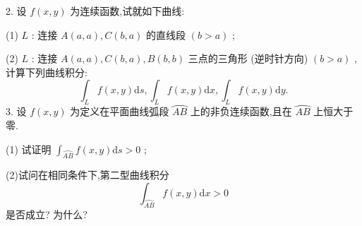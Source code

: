2. 设 \(f\left( {x,y}\right)\) 为连续函数,试就如下曲线:

(1) \(L\) : 连接 \(A\left( {a,a}\right) ,C\left( {b,a}\right)\) 的直线段 \(\left( {b > a}\right)\) ;

(2) \(L\) : 连接 \(A\left( {a,a}\right) ,C\left( {b,a}\right) ,B\left( {b,b}\right)\) 三点的三角形 (逆时针方向) \(\left( {b > a}\right)\) , 计算下列曲线积分:
\[
{\int }_{L}f\left( {x,y}\right) \mathrm{d}s,{\int }_{L}f\left( {x,y}\right) \mathrm{d}x,{\int }_{L}f\left( {x,y}\right) \mathrm{d}y.
\]
3. 设 \(f\left( {x,y}\right)\) 为定义在平面曲线弧段 \(\overset{⏜}{AB}\) 上的非负连续函数,且在 \(\overset{⏜}{AB}\) 上恒大于零.

(1) 试证明 \({\int }_{\overset{⏜}{AB}}f\left( {x,y}\right) \mathrm{d}s > 0\) ;

(2)试问在相同条件下,第二型曲线积分
\[
{\int }_{\overset{⏜}{AB}}f\left( {x,y}\right) \mathrm{d}x > 0
\]
是否成立? 为什么?

